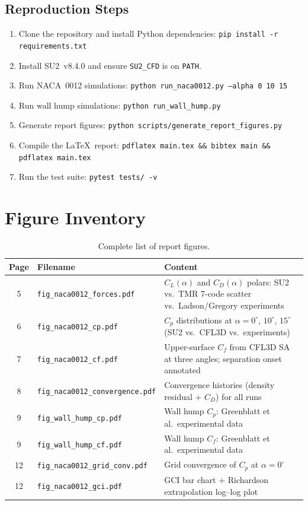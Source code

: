 \documentclass[11pt,a4paper]{article}
\begin{document}
\subsection*{Reproduction Steps}
\begin{enumerate}
  \item Clone the repository and install Python dependencies:
    \texttt{pip install -r requirements.txt}
  \item Install SU2~v8.4.0 and ensure \texttt{SU2\_CFD} is on \texttt{PATH}.
  \item Run NACA~0012 simulations:
    \texttt{python run\_naca0012.py --alpha 0 10 15}
  \item Run wall hump simulations:
    \texttt{python run\_wall\_hump.py}
  \item Generate report figures:
    \texttt{python scripts/generate\_report\_figures.py}
  \item Compile the \LaTeX\ report:
    \texttt{pdflatex main.tex \&\& bibtex main \&\& pdflatex main.tex}
  \item Run the test suite:
    \texttt{pytest tests/ -v}
\end{enumerate}

\section{Figure Inventory}
\label{app:figures}

\begin{table}[!ht]
\centering
\caption{Complete list of report figures.}
\begin{tabular}{clp{7cm}}
\toprule
\textbf{Page} & \textbf{Filename} & \textbf{Content} \\
\midrule
5  & \texttt{fig\_naca0012\_forces.pdf}     & $C_L(\alpha)$ and $C_D(\alpha)$ polars:
     SU2 vs.\ TMR 7-code scatter vs.\ Ladson/Gregory experiments \\
6  & \texttt{fig\_naca0012\_cp.pdf}         & $C_p$ distributions at $\alpha = 0^\circ$,
     $10^\circ$, $15^\circ$ (SU2 vs.\ CFL3D vs.\ experiments) \\
7  & \texttt{fig\_naca0012\_cf.pdf}         & Upper-surface $C_f$ from CFL3D SA
     at three angles; separation onset annotated \\
8  & \texttt{fig\_naca0012\_convergence.pdf} & Convergence histories (density residual
     + $C_D$) for all runs \\
9  & \texttt{fig\_wall\_hump\_cp.pdf}       & Wall hump $C_p$: Greenblatt et al.\
     experimental data \\
9  & \texttt{fig\_wall\_hump\_cf.pdf}       & Wall hump $C_f$: Greenblatt et al.\
     experimental data \\
12 & \texttt{fig\_naca0012\_grid\_conv.pdf} & Grid convergence of $C_p$ at $\alpha=0^\circ$ \\
12 & \texttt{fig\_naca0012\_gci.pdf}        & GCI bar chart + Richardson extrapolation
     log--log plot \\
\bottomrule
\end{tabular}
\end{table}
\end{document}

